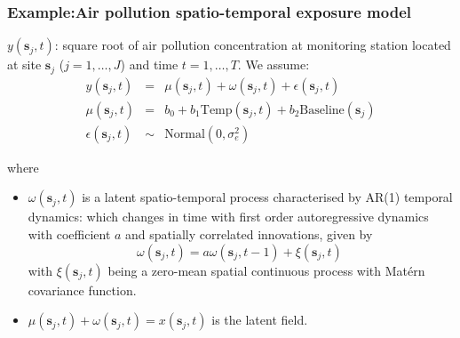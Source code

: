 \documentclass[slidestop,compress,serif,10pt]{beamer}
\begin{document}
\begin{frame}
\frametitle{Example:Air pollution spatio-temporal exposure model}

$y(\bm s_{j},t)$: square root of air pollution concentration at  monitoring station located at site $\bm s_j$ ($j=1,\ldots, J$) and time $t=1,\ldots, T$. We assume:
\begin{eqnarray*}
y(\bm s_{j},t)  &=& \mu(\bm s_{j},t) + \omega(\bm s_{j},t) + \epsilon(\bm s_{j},t)\\
\mu(\bm s_{j},t)&=&b_0+ b_1\text{Temp}(\bm s_{j},t)+ b_2 \text{Baseline}(\bm s_{j})\\
\epsilon(\bm s_{j},t)&\sim& \text{Normal}(0, \sigma^{2}_{e})   
\end{eqnarray*}

where 
\begin{itemize}
\item<2-> $\omega(\bm s_{j},t) $ is a latent spatio-temporal process characterised by AR(1) temporal dynamics:
which changes in time with first order autoregressive dynamics with coefficient $a$ and spatially correlated innovations, given by
\[
\omega(\bm s_{j},t) =a \omega(\bm s_{j},t-1)  + \xi(\bm s_{j},t) \;
\]
with $\xi(\bm s_{j},t)$ being a zero-mean spatial continuous process with Mat\'ern covariance function.
\item<3-> $\mu(\bm s_{j},t) + \omega(\bm s_{j},t) = x(\bm s_{j},t)$ is the latent field.
\end{itemize}
\end{frame}
\end{document}
